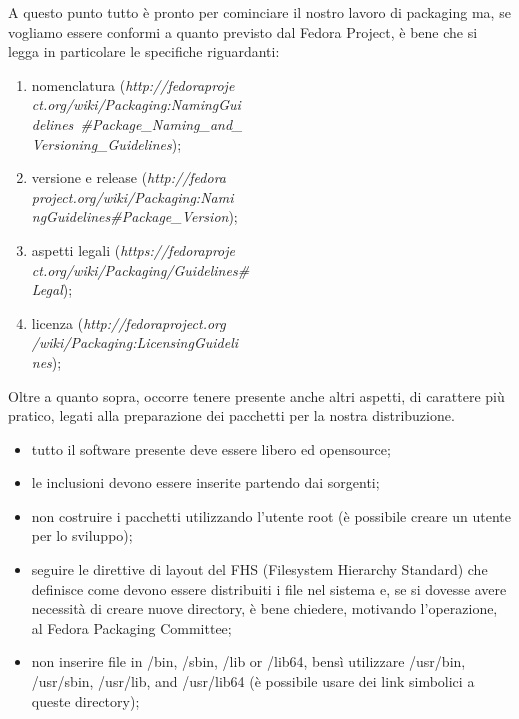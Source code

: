 A questo punto tutto è pronto per cominciare il nostro lavoro di packaging ma, se vogliamo essere conformi a quanto previsto dal Fedora Project, è bene che si legga in particolare le specifiche riguardanti:

\begin{enumerate}
\item nomenclatura ({\itshape http://fedoraproje\\ct.org/wiki/Packaging:NamingGui\\delines\ \#Package\_Naming\_and\_\\Versioning\_Guidelines});
\item versione e release ({\itshape http://fedora\\project.org/wiki/Packaging:Nami\\ngGuidelines\#Package\_Version});
\item aspetti legali ({\itshape https://fedoraproje\\ct.org/wiki/Packaging/Guidelines\#\\Legal});
\item licenza ({\itshape http://fedoraproject.org\\/wiki/Packaging:LicensingGuideli\\nes});
\end{enumerate}

Oltre a quanto sopra, occorre tenere presente anche altri aspetti, di carattere più pratico, legati alla preparazione dei pacchetti per la nostra distribuzione.\\
 
\begin{itemize}
\item tutto il software presente deve essere libero ed opensource;
\item le inclusioni devono essere inserite partendo dai sorgenti;
\item non costruire i pacchetti utilizzando l'utente root (è possibile creare un utente per lo sviluppo);
\item seguire le direttive di layout del FHS (Filesystem Hierarchy Standard) che definisce come devono essere distribuiti i file nel sistema e, se si dovesse avere necessità di creare nuove directory, è bene chiedere, motivando l'operazione, al Fedora Packaging Committee;
\item non inserire file in /bin, /sbin, /lib or /lib64, bensì utilizzare /usr/bin, /usr/sbin, /usr/lib, and /usr/lib64 (è possibile usare dei link simbolici a queste directory);
\end{itemize}


